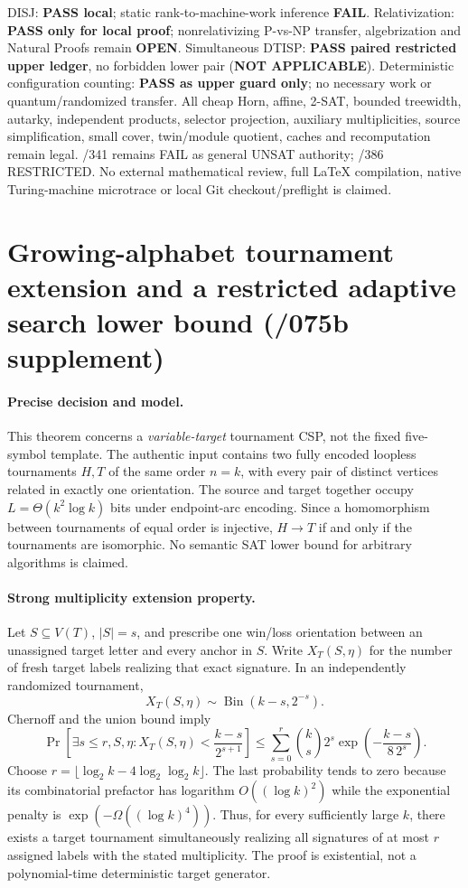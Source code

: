 \documentclass[11pt]{article}
\begin{document}
DISJ: \textbf{PASS local}; static rank-to-machine-work inference
\textbf{FAIL}. Relativization: \textbf{PASS only for local proof};
nonrelativizing P-vs-NP transfer, algebrization and
Natural Proofs remain \textbf{OPEN}. Simultaneous DTISP:
\textbf{PASS paired restricted upper ledger}, no forbidden
lower pair (\textbf{NOT APPLICABLE}). Deterministic
configuration counting: \textbf{PASS as upper guard only};
no necessary work or quantum/randomized transfer.
All cheap Horn, affine, 2-SAT, bounded treewidth,
autarky, independent products, selector projection,
auxiliary multiplicities, source simplification, small cover,
twin/module quotient, caches and recomputation remain legal.
/341 remains FAIL as general UNSAT authority; /386
RESTRICTED. No external mathematical review, full
LaTeX compilation, native Turing-machine microtrace or local
Git checkout/preflight is claimed.

\section{Growing-alphabet tournament extension and a restricted adaptive search lower bound (/075b supplement)}
\paragraph{Precise decision and model.}
This theorem concerns a \emph{variable-target} tournament CSP,
not the fixed five-symbol template. The authentic input contains
two fully encoded loopless tournaments $H,T$ of the same order
$n=k$, with every pair of distinct vertices related in exactly
one orientation. The source and target together occupy
$L=\Theta(k^2\log k)$ bits under endpoint-arc encoding.
Since a homomorphism between tournaments of equal order is
injective, $H\to T$ if and only if the tournaments are isomorphic.
No semantic SAT lower bound for arbitrary algorithms is claimed.

\paragraph{Strong multiplicity extension property.}
Let $S\subseteq V(T)$, $|S|=s$, and prescribe one win/loss
orientation between an unassigned target letter and every
anchor in $S$. Write $X_T(S,\eta)$ for the number of fresh
target labels realizing that exact signature. In an independently
randomized tournament,
\[
X_T(S,\eta)\sim\operatorname{Bin}(k-s,2^{-s}).
\]
Chernoff and the union bound imply
\[
\Pr\left[
\exists s\le r,S,\eta:
X_T(S,\eta)<\frac{k-s}{2^{s+1}}\right]
\le
\sum_{s=0}^r {k\choose s}2^s
\exp\left(-\frac{k-s}{8\,2^s}\right).
\]
Choose $r=\lfloor\log_2 k-4\log_2\log_2 k\rfloor$.
The last probability tends to zero because its combinatorial
prefactor has logarithm $O((\log k)^2)$ while the exponential
penalty is $\exp(-\Omega((\log k)^4))$.
Thus, for every sufficiently large $k$, there exists
a target tournament simultaneously realizing all signatures
of at most $r$ assigned labels with the stated multiplicity.
The proof is existential, not a polynomial-time deterministic
target generator.
\end{document}
